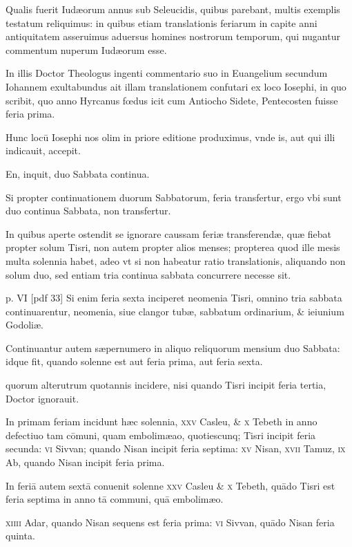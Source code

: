 \begin{parnumbers}
Qualis fuerit Iudæorum annus sub Seleucidis, quibus parebant,
multis exemplis testatum reliquimus: in quibus etiam translationis
feriarum in capite anni antiquitatem asseruimus aduersus homines
nostrorum temporum, qui nugantur commentum nuperum
Iudæorum esse.

In illis Doctor Theologus ingenti commentario
suo in Euangelium secundum Iohannem exultabundus ait illam
translationem confutari ex loco Iosephi, in quo scribit, quo anno
Hyrcanus fœdus icit cum Antiocho Sidete, Pentecosten fuisse feria
prima.

Hunc locū Iosephi nos olim in priore editione produximus,
vnde is, aut qui illi indicauit, accepit.

En, inquit, duo Sabbata continua.

Si propter continuationem duorum Sabbatorum, feria transfertur,
ergo vbi sunt duo continua Sabbata, non transfertur. 

In quibus aperte ostendit se ignorare caussam feriæ transferendæ, quæ fiebat
propter solum Tisri, non autem propter alios menses; propterea
quod ille mesis multa solennia habet, adeo vt si non habeatur
ratio translationis, aliquando non solum duo, sed entiam tria continua
sabbata concurrere necesse sit.

\clearpage
p. VI [pdf 33]
Si enim feria sexta inciperet
neomenia Tisri, omnino tria sabbata continuarentur, neomenia,
siue clangor tubæ, sabbatum ordinarium, \& ieiunium Godoliæ.

Continuantur autem sæpernumero in aliquo reliquorum mensium
duo Sabbata: idque fit, quando solenne est aut feria prima, aut feria
sexta.

quorum alterutrum quotannis incidere, nisi quando Tisri
incipit feria tertia, Doctor ignorauit.

In primam feriam incidunt
hæc solennia, \textsc{xxv} Casleu, \& \textsc{x} Tebeth in anno defectiuo tam
cōmuni, quam embolimæao, quotiescunq; Tisri incipit feria secunda:
\textsc{vi} Sivvan; quando Nisan incipit feria septima:
\textsc{xv} Nisan, \textsc{xvii} Tamuz,
\textsc{ix} Ab, quando Nisan incipit feria prima.

In feriā autem sextā
conuenit solenne \textsc{xxv} Casleu \& \textsc{x} Tebeth, quādo Tisri est feria
septima in anno tā communi, quā embolimæo.

\textsc{xiiii} Adar, quando
Nisan sequens est feria prima: \textsc{vi} Sivvan, quādo Nisan feria quinta.


\end{parnumbers}
